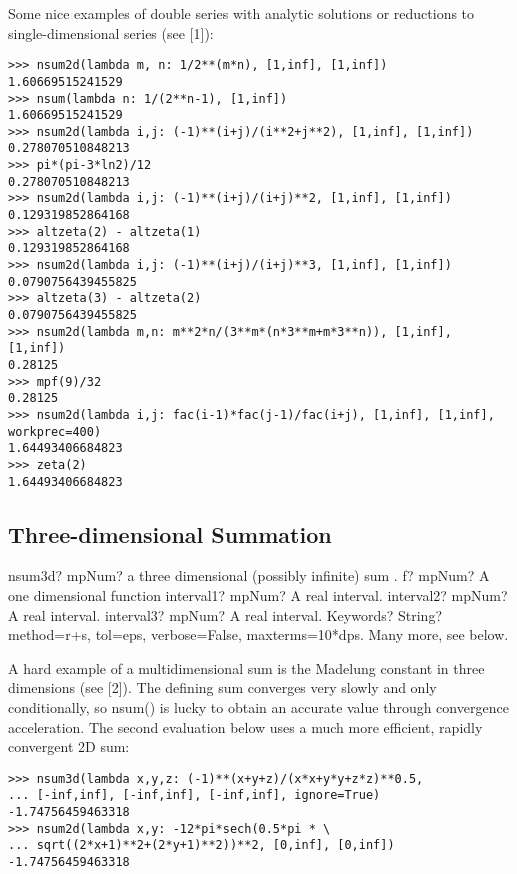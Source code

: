 Some nice examples of double series with analytic solutions or reductions to single-dimensional series (see [1]):

\begin{lstlisting}
>>> nsum2d(lambda m, n: 1/2**(m*n), [1,inf], [1,inf])
1.60669515241529
>>> nsum(lambda n: 1/(2**n-1), [1,inf])
1.60669515241529
>>> nsum2d(lambda i,j: (-1)**(i+j)/(i**2+j**2), [1,inf], [1,inf])
0.278070510848213
>>> pi*(pi-3*ln2)/12
0.278070510848213
>>> nsum2d(lambda i,j: (-1)**(i+j)/(i+j)**2, [1,inf], [1,inf])
0.129319852864168
>>> altzeta(2) - altzeta(1)
0.129319852864168
>>> nsum2d(lambda i,j: (-1)**(i+j)/(i+j)**3, [1,inf], [1,inf])
0.0790756439455825
>>> altzeta(3) - altzeta(2)
0.0790756439455825
>>> nsum2d(lambda m,n: m**2*n/(3**m*(n*3**m+m*3**n)), [1,inf], [1,inf])
0.28125
>>> mpf(9)/32
0.28125
>>> nsum2d(lambda i,j: fac(i-1)*fac(j-1)/fac(i+j), [1,inf], [1,inf], workprec=400)
1.64493406684823
>>> zeta(2)
1.64493406684823
\end{lstlisting}



\subsection{Three-dimensional Summation}

\begin{mpFunctionsExtract}
	\mpFunctionFive
	{nsum3d? mpNum? a three dimensional (possibly infinite) sum .}
	{f? mpNum? A one dimensional function}
	{interval1? mpNum? A real interval.}	
	{interval2? mpNum? A real interval.}
	{interval3? mpNum? A real interval.}			
	{Keywords? String? method=r+s, tol=eps, verbose=False, maxterms=10*dps. Many more, see below.}	
\end{mpFunctionsExtract}


\vpara
A hard example of a multidimensional sum is the Madelung constant in three dimensions (see [2]). The defining sum converges very slowly and only conditionally, so nsum() is lucky to obtain an accurate value through convergence acceleration. The second evaluation below uses a much more efficient, rapidly convergent 2D sum:

\begin{lstlisting}
>>> nsum3d(lambda x,y,z: (-1)**(x+y+z)/(x*x+y*y+z*z)**0.5,
... [-inf,inf], [-inf,inf], [-inf,inf], ignore=True)
-1.74756459463318
>>> nsum2d(lambda x,y: -12*pi*sech(0.5*pi * \
... sqrt((2*x+1)**2+(2*y+1)**2))**2, [0,inf], [0,inf])
-1.74756459463318
\end{lstlisting}

